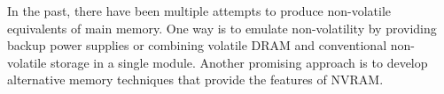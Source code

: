 In the past, there have been multiple attempts to produce non-volatile
equivalents of main memory. One way is to emulate non-volatility by providing
backup power supplies or combining volatile \ac{DRAM} and conventional
non-volatile storage in a single module. Another promising approach is to
develop alternative memory techniques that provide the features of \ac{NVRAM}.



%
%
%
